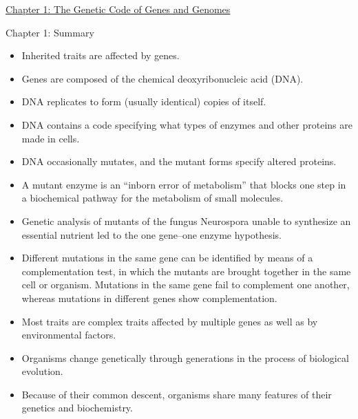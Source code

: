 \documentclass[12pt,letterpaper]{article}
\newcommand{\thetitle}{\hypertarget{home}{Essential Genetics and Genomics}}
\begin{document}
\renewcommand{\thetitle}{\hypertarget{1}{The Genetic Code of Genes
and Genomes}}
\hypertarget{1}{} 
\hypertarget{1.r}{}
\begin{chapbox}{\hyperlink{home}{Chapter 1: The Genetic Code of Genes
    and Genomes}}
\begin{probbox}{Chapter 1: Summary}{
    \begin{itemize}
        \item Inherited traits are affected by genes. 
        \item Genes are composed of the chemical deoxyribonucleic acid (DNA). 
        \item DNA replicates to form (usually identical) copies of itself. 
        \item DNA contains a code specifying what types of enzymes and other proteins are made in cells. 
        \item DNA occasionally mutates, and the mutant forms specify altered proteins. 
        \item A mutant enzyme is an “inborn error of metabolism” that blocks one step in a biochemical pathway for the metabolism of small molecules. 
        \item Genetic analysis of mutants of the fungus Neurospora unable to synthesize an essential nutrient led to the one gene–one enzyme hypothesis. 
        \item Different mutations in the same gene can be identified by means of a complementation test, in which the mutants are brought together in the same cell or organism. Mutations in the same gene fail to complement one another, whereas mutations in different genes show complementation. 
        \item Most traits are complex traits affected by multiple genes as well as by environmental factors. 
        \item Organisms change genetically through generations in the process of biological evolution. 
        \item Because of their common descent, organisms share many features of their genetics and biochemistry.
    \end{itemize}
}\end{probbox}
\end{chapbox}

\end{document}
